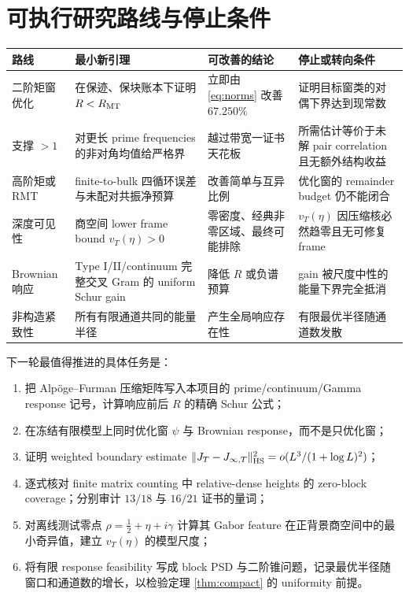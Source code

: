 \documentclass[UTF8,11pt,a4paper]{ctexart}
\theoremstyle{definition}
\theoremstyle{remark}
\begin{document}
\section{可执行研究路线与停止条件}

\begin{longtable}{p{}p{}p{}p{}}
\toprule
路线 & 最小新引理 & 可改善的结论 & 停止或转向条件\\
\midrule
\endhead
二阶矩窗优化
& 在保迹、保块账本下证明 $R<R_{\rm MT}$
& 立即由 \eqref{eq:norms} 改善 $67.250\%$
& 证明目标窗类的对偶下界达到现常数\\
\addlinespace
支撑 $>1$
& 对更长 prime frequencies 的非对角均值给严格界
& 越过带宽一证书天花板
& 所需估计等价于未解 pair correlation 且无额外结构收益\\
\addlinespace
高阶矩或 RMT
& finite-to-bulk 四循环误差与未配对共振净预算
& 改善简单与互异比例
& 优化窗的 remainder budget 仍不能闭合\\
\addlinespace
深度可见性
& 商空间 lower frame bound $v_T(\eta)>0$
& 零密度、经典非零区域、最终可能排除
& $v_T(\eta)$ 因压缩核必然趋零且无可修复 frame\\
\addlinespace
Brownian 响应
& Type I/II/continuum 完整交叉 Gram 的 uniform Schur gain
& 降低 $R$ 或负谱预算
& gain 被尺度中性的能量下界完全抵消\\
\addlinespace
非构造紧致性
& 所有有限通道共同的能量半径
& 产生全局响应存在性
& 有限最优半径随通道数发散\\
\bottomrule
\end{longtable}

下一轮最值得推进的具体任务是：
\begin{enumerate}
\item 把 Alpöge--Furman 压缩矩阵写入本项目的
prime/continuum/Gamma response 记号，计算响应前后 $R$ 的精确 Schur 公式；
\item 在冻结有限模型上同时优化窗 $\psi$ 与 Brownian response，而不是只优化窗；
\item 证明 weighted boundary estimate
$\|J_T-J_{\infty,T}\|_{\rm HS}^2=o(L^3/(1+\log L)^2)$；
\item 逐式核对 finite matrix counting 中 relative-dense heights 的
zero-block coverage；分别审计 $13/18$ 与 $16/21$ 证书的量词；
\item 对离线测试零点 $\rho=\tfrac12+\eta+i\gamma$ 计算其 Gabor feature
在正背景商空间中的最小奇异值，建立 $v_T(\eta)$ 的模型尺度；
\item 将有限 response feasibility 写成 block PSD 与二阶锥问题，记录最优半径随
窗口和通道数的增长，以检验定理 \ref{thm:compact} 的 uniformity 前提。
\end{enumerate}
\end{document}

